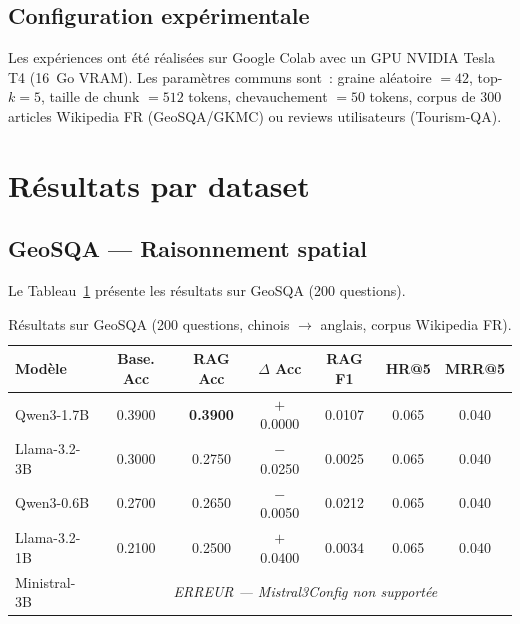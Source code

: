 \documentclass[12pt,a4paper]{article}
\begin{document}
\subsection{Configuration exp\'erimentale}

Les exp\'eriences ont \'et\'e r\'ealis\'ees sur Google Colab avec un GPU NVIDIA Tesla T4 (16~Go VRAM). Les param\`etres communs sont~: graine al\'eatoire $= 42$, top-$k = 5$, taille de chunk $= 512$ tokens, chevauchement $= 50$ tokens, corpus de 300 articles Wikipedia FR (GeoSQA/GKMC) ou reviews utilisateurs (Tourism-QA).


\section{R\'esultats par dataset}

\subsection{GeoSQA --- Raisonnement spatial}

Le Tableau~\ref{tab:geosqa} pr\'esente les r\'esultats sur GeoSQA (200 questions).

\begin{table}[H]
\centering
\caption{R\'esultats sur GeoSQA (200 questions, chinois $\to$ anglais, corpus Wikipedia FR).}
\label{tab:geosqa}
\begin{tabular}{lcccccc}
\toprule
\textbf{Mod\`ele} & \textbf{Base. Acc} & \textbf{RAG Acc} & \textbf{$\Delta$ Acc} & \textbf{RAG F1} & \textbf{HR@5} & \textbf{MRR@5} \\
\midrule
Qwen3-1.7B & 0.3900 & \textbf{0.3900} & $+$0.0000 & 0.0107 & 0.065 & 0.040 \\
Llama-3.2-3B & 0.3000 & 0.2750 & $-$0.0250 & 0.0025 & 0.065 & 0.040 \\
Qwen3-0.6B & 0.2700 & 0.2650 & $-$0.0050 & 0.0212 & 0.065 & 0.040 \\
Llama-3.2-1B & 0.2100 & 0.2500 & $+$0.0400 & 0.0034 & 0.065 & 0.040 \\
\midrule
Ministral-3B & \multicolumn{6}{c}{\textit{ERREUR --- Mistral3Config non support\'ee}} \\
\bottomrule
\end{tabular}
\end{table}
\end{document}
